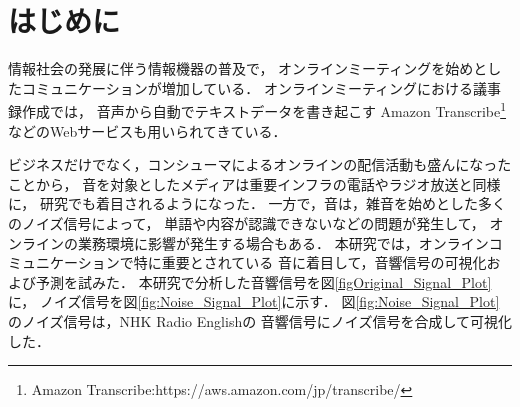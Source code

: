 \documentclass{deimj}
\begin{document}
\pagestyle{empty}

\maketitle
\section{はじめに}
情報社会の発展に伴う情報機器の普及で，
オンラインミーティングを始めとしたコミュニケーションが増加している．
%
オンラインミーティングにおける議事録作成では，
音声から自動でテキストデータを書き起こす
Amazon Transcribe\footnote{Amazon Transcribe:https://aws.amazon.com/jp/transcribe/}などのWebサービスも用いられてきている．

ビジネスだけでなく，コンシューマによるオンラインの配信活動も盛んになったことから，
音を対象としたメディアは重要インフラの電話やラジオ放送と同様に，
研究でも着目されるようになった．
%
一方で，音は，雑音を始めとした多くのノイズ信号によって，
単語や内容が認識できないなどの問題が発生して，
オンラインの業務環境に影響が発生する場合もある．
%
本研究では，オンラインコミュニケーションで特に重要とされている
音に着目して，音響信号の可視化および予測を試みた．
%
本研究で分析した音響信号を図\ref{figOriginal_Signal_Plot}に，
ノイズ信号を図\ref{fig:Noise_Signal_Plot}に示す．
図\ref{fig:Noise_Signal_Plot}のノイズ信号は，NHK Radio Englishの
音響信号にノイズ信号を合成して可視化した．
\end{document}
